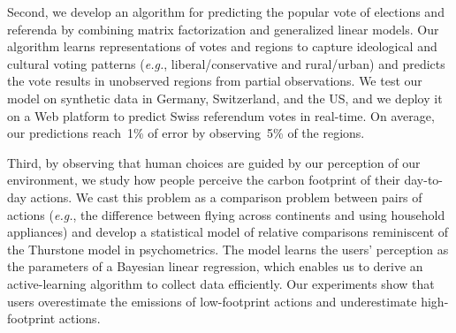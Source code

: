 
Second, we develop an algorithm for predicting the popular vote of elections and referenda by combining matrix factorization and generalized linear models.
Our algorithm learns representations of votes and regions to capture ideological and cultural voting patterns (\textit{e.g.}, liberal/conservative and rural/urban) and predicts the vote results in unobserved regions from partial observations.
We test our model on synthetic data in Germany, Switzerland, and the US, and we deploy it on a Web platform to predict Swiss referendum votes in real-time.
On average, our predictions reach~1\% of error by observing~5\% of the regions.

Third, by observing that human choices are guided by our perception of our environment, we study how people perceive the carbon footprint of their day-to-day actions.
We cast this problem as a comparison problem between pairs of actions (\textit{e.g.}, the difference between flying across continents and using household appliances) and develop a statistical model of relative comparisons reminiscent of the Thurstone model in psychometrics.
The model learns the users’ perception as the parameters of a Bayesian linear regression, which enables us to derive an active-learning algorithm to collect data efficiently.
Our experiments show that users overestimate the emissions of low-footprint actions and underestimate high-footprint actions.

